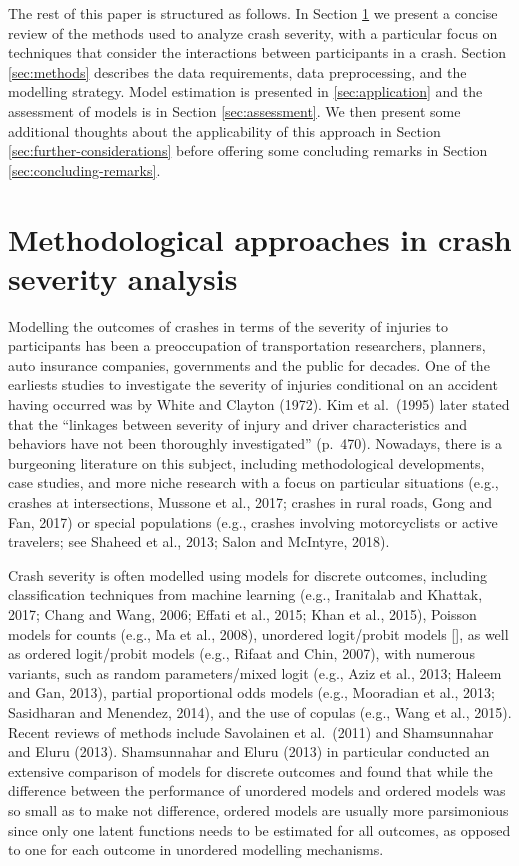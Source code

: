 \documentclass[]{elsarticle} %
\begin{document}
The rest of this paper is structured as follows. In Section
\ref{sec:review-of-methods} we present a concise review of the methods
used to analyze crash severity, with a particular focus on techniques
that consider the interactions between participants in a crash. Section
\ref{sec:methods} describes the data requirements, data preprocessing,
and the modelling strategy. Model estimation is presented in
\ref{sec:application} and the assessment of models is in Section
\ref{sec:assessment}. We then present some additional thoughts about the
applicability of this approach in Section
\ref{sec:further-considerations} before offering some concluding remarks
in Section \ref{sec:concluding-remarks}.

\hypertarget{sec:review-of-methods}{%
\section{Methodological approaches in crash severity
analysis}\label{sec:review-of-methods}}

Modelling the outcomes of crashes in terms of the severity of injuries
to participants has been a preoccupation of transportation researchers,
planners, auto insurance companies, governments and the public for
decades. One of the earliests studies to investigate the severity of
injuries conditional on an accident having occurred was by White and
Clayton (1972). Kim et al.~(1995) later stated that the ``linkages
between severity of injury and driver characteristics and behaviors have
not been thoroughly investigated'' (p.~470). Nowadays, there is a
burgeoning literature on this subject, including methodological
developments, case studies, and more niche research with a focus on
particular situations (e.g., crashes at intersections, Mussone et al.,
2017; crashes in rural roads, Gong and Fan, 2017) or special populations
(e.g., crashes involving motorcyclists or active travelers; see Shaheed
et al., 2013; Salon and McIntyre, 2018).

Crash severity is often modelled using models for discrete outcomes,
including classification techniques from machine learning (e.g.,
Iranitalab and Khattak, 2017; Chang and Wang, 2006; Effati et al., 2015;
Khan et al., 2015), Poisson models for counts (e.g., Ma et al., 2008),
unordered logit/probit models {[}{]}, as well as ordered logit/probit
models (e.g., Rifaat and Chin, 2007), with numerous variants, such as
random parameters/mixed logit (e.g., Aziz et al., 2013; Haleem and Gan,
2013), partial proportional odds models (e.g., Mooradian et al., 2013;
Sasidharan and Menendez, 2014), and the use of copulas (e.g., Wang et
al., 2015). Recent reviews of methods include Savolainen et al.~(2011)
and Shamsunnahar and Eluru (2013). Shamsunnahar and Eluru (2013) in
particular conducted an extensive comparison of models for discrete
outcomes and found that while the difference between the performance of
unordered models and ordered models was so small as to make not
difference, ordered models are usually more parsimonious since only one
latent functions needs to be estimated for all outcomes, as opposed to
one for each outcome in unordered modelling mechanisms.
\end{document}
